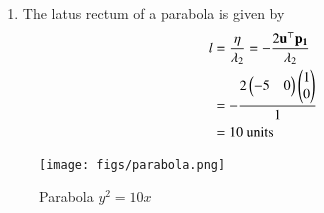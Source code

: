 \documentclass[journal,12pt,twocolumn]{IEEEtran}
\renewcommand{\vec}[1]{\boldsymbol{\mathbf{#1}}}
\begin{document}
\begin{enumerate}
\item The latus rectum of a parabola is given by 
\begin{align}
	l &= \frac{\eta}{\lambda_2}  
	 = -\frac{2\vec{u}^\top\vec{p_1}}{\lambda_2} \\
	 &= -\frac{2\myvec{-5 & 0}\myvec{1 \\ 0}}{1} \\
	 &= 10 \text{ units }
\end{align}
\end{enumerate}

\begin{figure}[H]
    \centering
    \texttt{[image: figs/parabola.png]}
    \caption{Parabola $y^2 = 10x$}
    \label{fig:parabola}
\end{figure}
\end{document}
